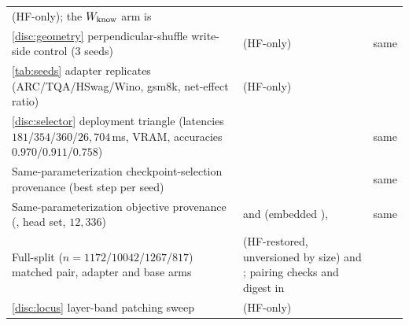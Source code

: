 \begin{table}[tbp]
\begin{tabular}{L{4.6cm} L{5.6cm} L{3.6cm}}
 (HF-only);
the $W_{\mathrm{know}}$ arm is 
&  \\
\cref{disc:geometry} perpendicular-shuffle write-side control (3 seeds) &
 (HF-only) & same \\
\cref{tab:seeds} adapter replicates (ARC/TQA/HSwag/Wino, gsm8k, net-effect ratio) &
 (HF-only) &
 \\
\cref{disc:selector} deployment triangle (latencies $181$/$354$/$360$/$26{,}704$\,ms,
VRAM, accuracies $0.970$/$0.911$/$0.758$) &
 & same \\
Same-parameterization checkpoint-selection provenance (best step per seed) &
 & same \\
Same-parameterization objective provenance (, head set, $12{,}336$) &
 and
 (embedded ),
 & same \\
Full-split ($n{=}1172$/$10042$/$1267$/$817$) matched pair, adapter and base arms &
 (HF-restored, unversioned by
size) and ; pairing checks and
digest in  &
 \\
\cref{disc:locus} layer-band patching sweep &  (HF-only)
&  \\
\bottomrule
\end{tabular}
\end{table}

